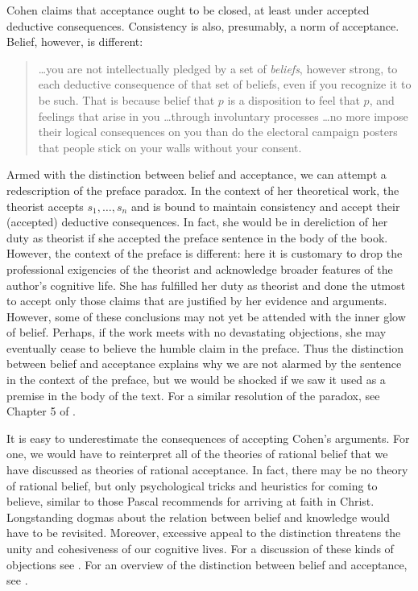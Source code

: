 Cohen claims that acceptance ought to be closed, at least under accepted
deductive consequences. Consistency is also, presumably, a norm of acceptance.
Belief, however, is different:
\begin{quote}
\ldots you are not intellectually pledged by a set of {\em beliefs}, however strong, to each deductive consequence of that set of beliefs, even if you recognize it to be such. That is because belief that $p$ is a disposition to feel that $p$, and feelings that arise in you \ldots through involuntary processes \ldots no more impose their logical consequences on you than do the electoral campaign posters that people stick on your walls without your consent. \citep[p. 31]{cohen1992essay}
\end{quote}

Armed with the distinction between belief and acceptance, we can attempt a
redescription of the preface paradox. In the context of her theoretical work,
the theorist accepts $s_1, \ldots, s_n$ and is bound to maintain consistency and
accept their (accepted) deductive consequences. In fact, she would be in
dereliction of her duty as theorist if she accepted the preface sentence in the
body of the book. However, the context of the preface is different: here it is
customary to drop the professional exigencies of the theorist and acknowledge
broader features of the author's cognitive life. She has fulfilled her duty as
theorist and done the utmost to accept only those claims that are justified by
her evidence and arguments. However, some of these conclusions may not yet be
attended with the inner glow of belief. Perhaps, if the work meets with no
devastating objections, she may eventually cease to believe the humble claim in
the preface. Thus the distinction between belief and acceptance explains why we
are not alarmed by the sentence in the context of the preface, but we would be
shocked if we saw it used as a premise in the body of the text. For a similar
resolution of the paradox, see Chapter 5 of \citet{stalnaker1984inquiry}.

It is easy to underestimate the consequences of accepting Cohen's arguments. For
one, we would have to reinterpret all of the theories of rational belief that we
have discussed as theories of rational acceptance. In fact, there may be no
theory of rational belief, but only psychological tricks and heuristics for
coming to believe, similar to those Pascal recommends for arriving at faith in
Christ. Longstanding dogmas about the relation between belief and knowledge
would have to be revisited. Moreover, excessive appeal to the distinction
threatens the unity and cohesiveness of our cognitive lives. For a discussion of
these kinds of objections see \citet{kvanvig2016intellectual}. For an overview
of the distinction between belief and acceptance, see \citet{weirich2004belief}.


